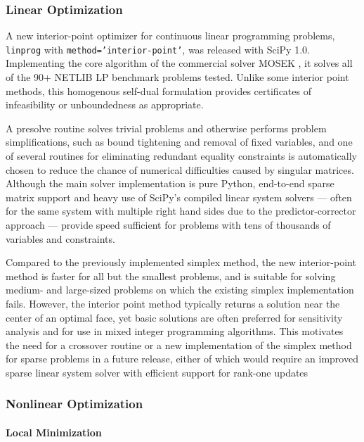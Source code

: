 \subsubsection*{Linear Optimization}

A new interior-point optimizer for continuous linear programming problems, \texttt{linprog} with \texttt{method='interior-point'}, was released with SciPy 1.0. Implementing the core algorithm of the commercial solver MOSEK \cite{andersen2000mosek}, it solves all of the 90+ NETLIB LP benchmark problems \cite{netlib} tested. Unlike some interior point methods, this homogenous self-dual formulation provides certificates of infeasibility or unboundedness as appropriate. 

A presolve routine \cite{andersen1995presolving} solves trivial problems and otherwise performs problem simplifications, such as bound tightening and removal of fixed variables, and one of several routines for eliminating redundant equality constraints is automatically chosen to reduce the chance of numerical difficulties caused by singular matrices. Although the main solver implementation is pure Python, end-to-end sparse matrix support and heavy use of SciPy's compiled linear system solvers --- often for the same system with multiple right hand sides due to the predictor-corrector approach --- provide speed sufficient for problems with tens of thousands of variables and constraints.

Compared to the previously implemented simplex method, the new interior-point method is faster for all but the smallest problems, and is suitable for solving medium- and large-sized problems on which the existing simplex implementation fails. However, the interior point method typically returns a solution near the center of an optimal face, yet basic solutions are often preferred for sensitivity analysis and for use in mixed integer programming algorithms. This motivates the need for a crossover routine or a new implementation of the simplex method for sparse problems in a future release, either of which would require an improved sparse linear system solver with efficient support for rank-one updates

\subsubsection*{Nonlinear Optimization}
\paragraph{Local Minimization}

